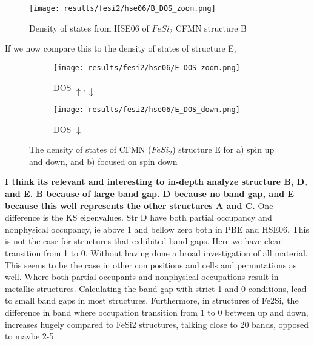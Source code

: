 \begin{figure}[H]
\centering
\texttt{[image: results/fesi2/hse06/B\_DOS\_zoom.png]}
\caption{Density of states from HSE06 of $FeSi_2$ CFMN structure B}
\label{DOS_hse06_B}
\end{figure}

If we now compare this to the density of states of structure E,

\begin{figure}[H]
\begin{subfigure}{0.5\textwidth}
\texttt{[image: results/fesi2/hse06/E\_DOS\_zoom.png]}
\caption{DOS $\uparrow, \downarrow$}
\end{subfigure}
\hfill
\begin{subfigure}{0.5\textwidth}
\texttt{[image: results/fesi2/hse06/E\_DOS\_down.png]}
\caption{DOS $\downarrow$}
\end{subfigure}
\caption{The density of states of CFMN ($FeSi_2$) structure E for a) spin up and down, and b) focused on spin down}
\end{figure}


\textbf{I think its relevant and interesting to in-depth analyze structure B, D, and E. B because of large band gap. D because no band gap, and E because this well represents the other structures A and C. }
One difference is the KS eigenvalues. Str D have both partial occupancy and nonphysical occupancy, ie above 1 and bellow zero both in PBE and HSE06. This is not the case for structures that exhibited band gaps. Here we have clear transition from 1 to 0. Without having done a broad investigation of all material. This seems to be the case in other compositions and cells and permutations as well. Where both partial occupants and nonphysical occupations result in metallic structures. Calculating the band gap with strict 1 and 0 conditions, lead to small band gaps in most structures. Furthermore, in structures of Fe2Si, the difference in band where occupation transition from 1 to 0 between up and down, increases hugely compared to FeSi2 structures, talking close to 20 bands, opposed to maybe 2-5. 

